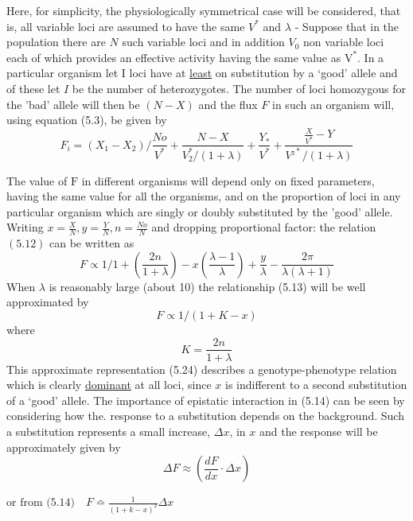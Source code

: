 Here, for simplicity, the physiologically symmetrical case will be considered, that is, all variable loci are assumed to have the same $V^{*}$ and $\lambda$ - Suppose that in the population there are $N$ such variable loci and in addition $V_{0}$ non variable loci each of which provides an effective activity having the same value as $\mathrm{V}^{*}$. In a particular organism let I loci have at \underline{least} on substitution by a `good' allele and of these let $I$ be the number of heterozygotes. The number of loci homozygous for the 'bad' allele will then be $(N-X)$ and the flux $F$ in such an organism will, using equation (5.3), be given by
%
\begin{equation}
F_{i}=\left(X_{1}-X_{2}\right) / \frac{No}{V^{*}}+\frac{N-X}{V^{*}_2/(1+\lambda)} + \frac{Y_{*}}{V^{*}}+\frac{\frac{X}{V^{*}}-Y}{V^{_{2}*} /(1+\lambda)}
\label{eqn:512}
\end{equation}

The value of $\mathrm{F}$ in different organisms will depend only on fixed parameters, having the same value for all the organisms, and on the proportion of loci in any particular organism which are singly or doubly substituted by the 'good' allele. Writing $x=\frac{X}{N}, y=\frac{Y}{N}, n=\frac{N o}{N}$ and dropping proportional factor: the relation $(5.12)$ can be written as
%
\begin{equation}
F \propto 1 \bigg/ 1+\left(\frac{2 n}{1+\lambda}\right)-x\left(\frac{\lambda-1}{\lambda}\right)+\frac{y}{\lambda}-\frac{2 \pi}{\lambda(\lambda+1)}
\label{eqn:513}
\end{equation}
%
When $\lambda$ is reasonably large (about 10) the relationship (5.13) will be well approximated by
%
\begin{equation}
F \propto 1 /(1+K-x)
\label{eqn:514}
\end{equation}
%
where
%
$$ K=\frac{2 n}{1+\lambda} $$
%
This approximate representation (5.24) describes a genotype-phenotype relation which is clearly \underline{dominant} at all loci, since $x$ is indifferent to a second substitution of a `good' allele. The importance of epistatic interaction in (5.14) can be seen by considering how the. response to a substitution depends on the background. Such a substitution represents a small increase, $\Delta x$, in $x$ and the response will be approximately given by
%
$$
\Delta F \approx\left(\frac{dF}{dx} \cdot \Delta x\right)
$$
%

$\displaystyle \mbox{or from (5.14)} \quad F \bumpeq \frac{1}{(1+k-x)^2} \Delta x$


